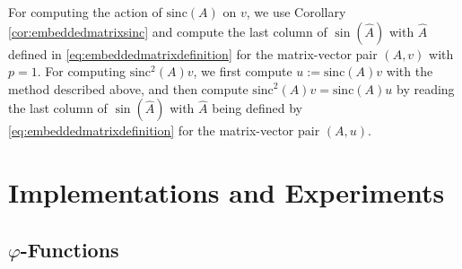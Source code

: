 For computing the action of $\mathrm{sinc}(A)$ on $v$, we use Corollary
\ref{cor:embeddedmatrixsinc} and compute the last column of $\sin(\hat{A})$ with
$\hat{A}$ defined in \eqref{eq:embeddedmatrixdefinition} for the matrix-vector
pair $(A, v)$ with $p=1$. For computing $\mathrm{sinc}^2(A) v$, we
first compute $u := \mathrm{sinc}(A)v$ with the method described above, and then
compute $\mathrm{sinc}^2(A) v = \mathrm{sinc}(A) u$ by reading the last column
of $\sin(\hat{A})$ with $\hat{A}$ being defined by
\eqref{eq:embeddedmatrixdefinition} for the matrix-vector pair $(A, u)$.

\section{Implementations and Experiments}
\label{sec:experiments}

\subsection{\texorpdfstring{$\varphi$}{Phi}-Functions}
